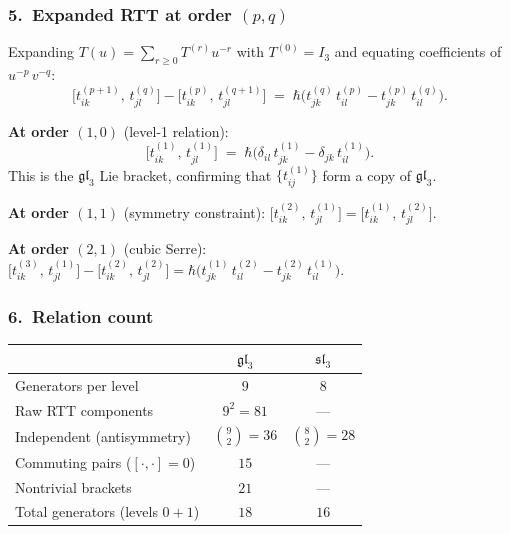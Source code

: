 \subsubsection*{5.\ Expanded RTT at order $(p,q)$}

Expanding $T(u) = \sum_{r \ge 0} T^{(r)} u^{-r}$ with $T^{(0)} = I_3$
and equating coefficients of $u^{-p}\,v^{-q}$:
\begin{equation}\label{eq:rtt-pq}
\bigl[t^{(p+1)}_{ik},\, t^{(q)}_{jl}\bigr]
- \bigl[t^{(p)}_{ik},\, t^{(q+1)}_{jl}\bigr]
\;=\;
\hbar\bigl(t^{(q)}_{jk}\,t^{(p)}_{il}
 - t^{(p)}_{jk}\,t^{(q)}_{il}\bigr).
\end{equation}

\noindent\textbf{At order $(1,0)$} (level-1 relation):
\begin{equation}\label{eq:level-1-sl3}
\bigl[t^{(1)}_{ik},\, t^{(1)}_{jl}\bigr]
\;=\;
\hbar\bigl(\delta_{il}\,t^{(1)}_{jk}
 - \delta_{jk}\,t^{(1)}_{il}\bigr).
\end{equation}
This is the $\mathfrak{gl}_3$ Lie bracket, confirming that
$\{t^{(1)}_{ij}\}$ form a copy of $\mathfrak{gl}_3$.

\noindent\textbf{At order $(1,1)$} (symmetry constraint):
$\bigl[t^{(2)}_{ik},\, t^{(1)}_{jl}\bigr]
= \bigl[t^{(1)}_{ik},\, t^{(2)}_{jl}\bigr]$.

\noindent\textbf{At order $(2,1)$} (cubic Serre):
$\bigl[t^{(3)}_{ik},\, t^{(1)}_{jl}\bigr]
- \bigl[t^{(2)}_{ik},\, t^{(2)}_{jl}\bigr]
= \hbar\bigl(t^{(1)}_{jk}\,t^{(2)}_{il}
 - t^{(2)}_{jk}\,t^{(1)}_{il}\bigr)$.

\subsubsection*{6.\ Relation count}

\begin{center}
\begin{tabular}{lcc}
\hline
& $\mathfrak{gl}_3$ & $\mathfrak{sl}_3$ \\
\hline
Generators per level & $9$ & $8$ \\
Raw RTT components & $9^2 = 81$ & --- \\
Independent (antisymmetry) & $\binom{9}{2} = 36$ & $\binom{8}{2} = 28$ \\
\quad Commuting pairs ($[\cdot,\cdot]=0$) & $15$ & --- \\
\quad Nontrivial brackets & $21$ & --- \\
Total generators (levels $0{+}1$) & $18$ & $16$ \\
\hline
\end{tabular}
\end{center}

